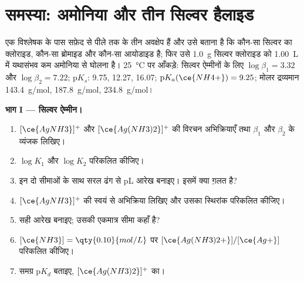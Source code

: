 \section{समस्या: अमोनिया और तीन सिल्वर हैलाइड}

\begin{problem}
\label{pb:b1:complexation:1}
एक विश्लेषक के पास सफ़ेद से पीले तक के तीन अवक्षेप हैं और उसे बताना है कि कौन-सा
सिल्वर का क्लोराइड, कौन-सा ब्रोमाइड और कौन-सा आयोडाइड है; फिर उसे
\qty{1.0}{g} सिल्वर क्लोराइड को \qty{1.00}{L} में यथासंभव कम
अमोनिया से घोलना है। \qty{25}{\celsius} पर आँकड़े: सिल्वर ऐम्मीनों के लिए $\log\beta_1 = 3.32$ और
$\log\beta_2 = 7.22$; $\mathrm{p}K_s$: 
9.75,  12.27,  16.07; $\mathrm{p}K_a(\ce{NH4+}) = 9.25$;
मोलर द्रव्यमान  \qty{143.4}{g/mol},  \qty{187.8}{g/mol},
 \qty{234.8}{g/mol}।

\medskip
\noindent\textbf{भाग I --- सिल्वर ऐम्मीन।}
\begin{enumerate}
  \item $[\ce{AgNH3}]^{+}$ और
        $[\ce{Ag(NH3)2}]^{+}$ की विरचन अभिक्रियाएँ तथा $\beta_1$ और $\beta_2$ के व्यंजक लिखिए।
  \item $\log K_1$ और $\log K_2$ परिकलित कीजिए।
  \item इन दो सीमाओं के साथ सरल ढंग से pL आरेख बनाइए। इसमें क्या
        ग़लत है?
  \item $[\ce{AgNH3}]^{+}$ की स्वयं से अभिक्रिया लिखिए और
        उसका स्थिरांक परिकलित कीजिए।
  \item सही आरेख बनाइए; उसकी एकमात्र सीमा कहाँ है?
  \item $[\ce{NH3}] = \qty{0.10}{mol/L}$ पर
        $[\ce{Ag(NH3)2+}]/[\ce{Ag+}]$ परिकलित कीजिए।
  \item समग्र  $\mathrm{p}K_d$ बताइए,
        $[\ce{Ag(NH3)2}]^{+}$ का।
\end{enumerate}


\end{problem}
